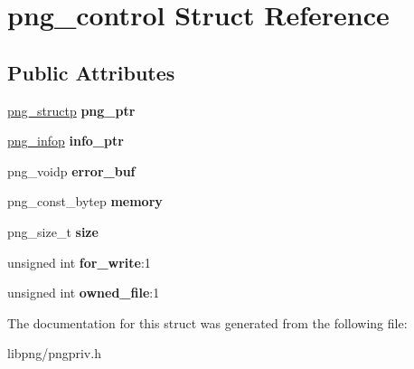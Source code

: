 \hypertarget{structpng__control}{\section{png\-\_\-control Struct Reference}
\label{structpng__control}
}
\subsection*{Public Attributes}
\begin{DoxyCompactItemize}
\item 
\hypertarget{structpng__control_a43333534632030e056daf3afa48db51e}{\hyperlink{structpng__struct__def}{png\-\_\-structp} {\bfseries png\-\_\-ptr}}\label{structpng__control_a43333534632030e056daf3afa48db51e}

\item 
\hypertarget{structpng__control_a224678ad762ab6a868c085f78ae932d4}{\hyperlink{structpng__info__def}{png\-\_\-infop} {\bfseries info\-\_\-ptr}}\label{structpng__control_a224678ad762ab6a868c085f78ae932d4}

\item 
\hypertarget{structpng__control_a905bcfc3a2d1497bdfbbc0727cefd716}{png\-\_\-voidp {\bfseries error\-\_\-buf}}\label{structpng__control_a905bcfc3a2d1497bdfbbc0727cefd716}

\item 
\hypertarget{structpng__control_a96fa2f945a1d3163b6c1f79bf66f2ddd}{png\-\_\-const\-\_\-bytep {\bfseries memory}}\label{structpng__control_a96fa2f945a1d3163b6c1f79bf66f2ddd}

\item 
\hypertarget{structpng__control_acd4e0d9812d5efe466d5401268149ad9}{png\-\_\-size\-\_\-t {\bfseries size}}\label{structpng__control_acd4e0d9812d5efe466d5401268149ad9}

\item 
\hypertarget{structpng__control_aa8b880c377588bebcf2fd9af99d58e4f}{unsigned int {\bfseries for\-\_\-write}\-:1}\label{structpng__control_aa8b880c377588bebcf2fd9af99d58e4f}

\item 
\hypertarget{structpng__control_a6d275eb8c40d78757eec1cf96b128961}{unsigned int {\bfseries owned\-\_\-file}\-:1}\label{structpng__control_a6d275eb8c40d78757eec1cf96b128961}

\end{DoxyCompactItemize}


The documentation for this struct was generated from the following file\-:\begin{DoxyCompactItemize}
\item 
libpng/pngpriv.\-h\end{DoxyCompactItemize}
